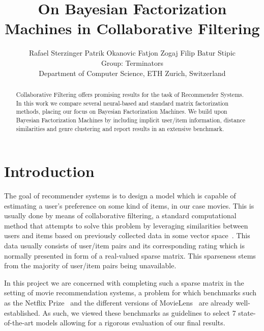 \documentclass[10pt,conference,compsocconf]{IEEEtran}
\newcommand{\spacing}{\hspace{1cm}}
\begin{document}
    \title{On Bayesian Factorization Machines in Collaborative Filtering}

    \author{
        Rafael Sterzinger \spacing Patrik Okanovic \spacing Fatjon Zogaj \spacing Filip Batur Stipic\\
        Group: Terminators\\
        Department of Computer Science, ETH Zurich, Switzerland
    }

    \maketitle

    \begin{abstract}
        Collaborative Filtering offers promising results for the task of Recommender Systems.
        In this work we compare several neural-based and standard matrix factorization methods, placing our focus on Bayesian Factorization Machines.
        We build upon Bayesian Factorization Machines by including implicit user/item information, distance similarities and genre clustering and report results in an extensive benchmark.

    \end{abstract}


    \section{Introduction}

    The goal of recommender systems is to design a model which is capable of estimating a user's preference on some kind of items, in our case movies.
    This is usually done by means of collaborative filtering, a standard computational method that attempts to solve this problem by leveraging similarities between users and items based on previously collected data in some vector space~\cite{CF_survey}.
    This data usually consists of user/item pairs and its corresponding rating which is normally presented in form of a real-valued sparse matrix.
    This sparseness stems from the majority of user/item pairs being unavailable.

    In this project we are concerned with completing such a sparse matrix in the setting of movie recommendation systems, a problem for which benchmarks such as the Netflix Prize~\cite{Netflix} and the different versions of MovieLens~\cite{Movielens} are already well-established.
    As such, we viewed these benchmarks as guidelines to select 7 state-of-the-art models allowing for a rigorous evaluation of our final results.
\end{document}
